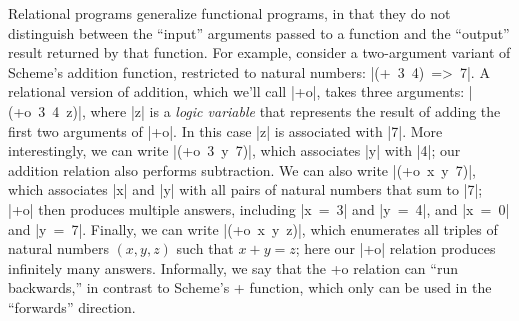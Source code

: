 Relational programs generalize functional programs, in that they do
not distinguish between the ``input'' arguments passed to a function
and the ``output'' result returned by that function.
%
For example, consider a two-argument variant of Scheme's addition function, restricted to natural numbers: \mbox{\scheme|(+ 3 4) => 7|}.
%
A relational version of addition, which we'll call \scheme|+o|, takes three arguments: \mbox{\scheme|(+o 3 4 z)|},
where \scheme|z| is a \emph{logic variable} that represents the result
of adding the first two arguments of \scheme|+o|. In this case
\scheme|z| is associated with \schemeresult|7|.
%
More interestingly, we can write \mbox{\scheme|(+o 3 y 7)|}, which
associates \scheme|y| with \schemeresult|4|; our addition relation
also performs subtraction.
%
We can also write \mbox{\scheme|(+o x y 7)|}, which associates
\scheme|x| and \scheme|y| with all pairs of natural numbers that sum
to \schemeresult|7|; \scheme|+o| then produces multiple
answers, including \mbox{\scheme|x = 3|} and \mbox{\scheme|y = 4|}, and
\mbox{\scheme|x = 0|} and \mbox{\scheme|y = 7|}.
%
Finally, we can write \mbox{\scheme|(+o x y z)|}, which enumerates 
all triples of natural numbers $(x, y, z)$ such that $x + y = z$; 
here our \scheme|+o| relation produces infinitely many answers.
%
Informally, we say that the +o relation can ``run backwards,'' in
contrast to Scheme's + function, which only can be used in the
``forwards'' direction.

